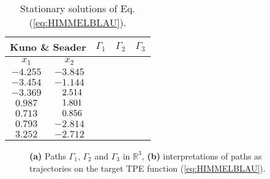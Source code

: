 \begin{table}[t]
	\centering
\begin{minipage}{0.45\textwidth}
	\caption{Stationary solutions of Eq. (\ref{eq:HIMMELBLAU}).}
	\label{table:EX1}
	\small
	\renewcommand{\arraystretch}{1.25}
	\begin{tabular}{c c l l l}
		\hline\hline
		\multicolumn{2}{l}{Kuno \& Seader\cite{Kuno:1988}} & 
		\multicolumn{1}{c}{$\mathit{\Gamma}_1$} 
		& $\mathit{\Gamma}_2$ & $\mathit{\Gamma}_3$\\
		\hline
		$x_1$ & $x_2$ &  &            & \\
		\hline
		$-4.255$ & $-3.845$ & \checkmark &            & \checkmark\\
		$-3.454$ & $-1.144$ & \checkmark &            & \checkmark\\
		$-3.369$ & $\hspace{0.23cm}2.514$  & \checkmark &            & 
		\checkmark\\
		\hfill$0.987$ & $\hspace{0.23cm}1.801$   &            & \checkmark & 
		\checkmark\\
		\hfill$0.713$ & $\hspace{0.23cm}0.856$   &            & \checkmark & 
		\checkmark\\
		\hfill$0.793$ & $-2.814$  &            & \checkmark & \checkmark\\
		\hfill$3.252$ & $-2.712$  &            & \checkmark & \checkmark\\
		\hline\hline
	\end{tabular}
	\end{minipage}
\end{table}


\begin{figure*}[h!]
	\centering
	\qquad
	\caption{\textbf{(a)} Paths $\mathit{\Gamma}_1$, $\mathit{\Gamma}_2$ and
		$\mathit{\Gamma}_3$ in $\mathbb{R}^3$, \textbf{(b)} interpretations of 
		paths
		as trajectories on the target TPE function (\ref{eq:HIMMELBLAU}).}%
	\label{fig:FIG34}%
\end{figure*}

